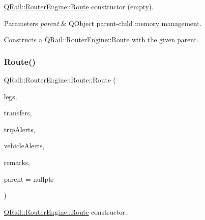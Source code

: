 \mbox{\hyperlink{classQRail_1_1RouterEngine_1_1Route}{Q\+Rail\+::\+Router\+Engine\+::\+Route}} constructor (empty). 


\begin{DoxyParams}{Parameters}
{\em parent} & Q\+Object parent-\/child memory management.\\
\hline
\end{DoxyParams}
Constructs a \mbox{\hyperlink{classQRail_1_1RouterEngine_1_1Route}{Q\+Rail\+::\+Router\+Engine\+::\+Route}} with the given parent. \mbox{\label{classQRail_1_1RouterEngine_1_1Route_a5063644c4df5409194b773a140189005}} 
\subsubsection{\texorpdfstring{Route()}{Route()}\hspace{0.1cm}{\footnotesize\ttfamily [2/2]}}
{\footnotesize\ttfamily Q\+Rail\+::\+Router\+Engine\+::\+Route\+::\+Route (\begin{DoxyParamCaption}\item[{const Q\+List$<$ \mbox{\hyperlink{classQRail_1_1RouterEngine_1_1RouteLeg}{Q\+Rail\+::\+Router\+Engine\+::\+Route\+Leg}} $\ast$ $>$ \&}]{legs,  }\item[{const Q\+List$<$ \mbox{\hyperlink{classQRail_1_1RouterEngine_1_1Transfer}{Q\+Rail\+::\+Router\+Engine\+::\+Transfer}} $\ast$ $>$ \&}]{transfers,  }\item[{const Q\+List$<$ \mbox{\hyperlink{classQRail_1_1AlertsEngine_1_1Message}{Q\+Rail\+::\+Alerts\+Engine\+::\+Message}} $\ast$ $>$ \&}]{trip\+Alerts,  }\item[{const Q\+List$<$ \mbox{\hyperlink{classQRail_1_1AlertsEngine_1_1Message}{Q\+Rail\+::\+Alerts\+Engine\+::\+Message}} $\ast$ $>$ \&}]{vehicle\+Alerts,  }\item[{const Q\+List$<$ \mbox{\hyperlink{classQRail_1_1AlertsEngine_1_1Message}{Q\+Rail\+::\+Alerts\+Engine\+::\+Message}} $\ast$ $>$ \&}]{remarks,  }\item[{Q\+Object $\ast$}]{parent = {\ttfamily nullptr} }\end{DoxyParamCaption})\hspace{0.3cm}{\ttfamily [explicit]}}



\mbox{\hyperlink{classQRail_1_1RouterEngine_1_1Route}{Q\+Rail\+::\+Router\+Engine\+::\+Route}} constructor. 



